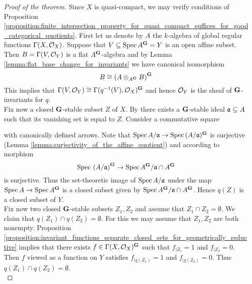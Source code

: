 \begin{proof}[Proof of the theorem]
Since $X$ is quasi-compact, we may verify conditions of Proposition \ref{proposition:finite_intersection_property_for_quasi_compact_suffices_for_good_categorical_quotients}. First let us denote by $A$ the $k$-algebra of global regular functions $\Gamma(X,{\mathcal O}_X)$. Suppose that $V \subseteq \mathrm{Spec}\, A^{\mathbf{G}} = Y$ is an open affine subset. Then $B = \Gamma(V,{\mathcal O}_Y)$ is a flat $A^{\mathbf{G}}$-algebra and by Lemma \ref{lemma:flat_base_change_for_invariants}  we have canonical isomorphism
$$B \cong \left(A\otimes_{A^{\mathbf{G}}}B\right)^{\mathbf{G}}$$
This implies that $\Gamma(V,{\mathcal O}_Y) \cong \Gamma(q^{-1}(V),{\mathcal O}_X)^{\mathbf{G}}$ and hence ${\mathcal O}_Y$ is the sheaf of $\mathbf{G}$-invariants for $q$.\\
Fix now a closed $\mathbf{G}$-stable subset $Z$ of $X$. By {\cite[Corollary 6.4]{Algebraic_groups}} there exists a $\mathbf{G}$-stable ideal $\mathfrak{a}\subseteq A$ such that its vanishing set is equal to $Z$. Consider a commutative square
\begin{center}
\end{center}
with canonically defined arrows. Note that $\mathrm{Spec}\, A/\mathfrak{a} \rightarrow \mathrm{Spec}\, (A/\mathfrak{a})^{\mathbf{G}}$ is surjective (Lemma \ref{lemma:surjectivity_of_the_affine_quotient}) and according to {\cite[Theorem 2.4]{Geometrically_reductive_and_Nagata}} morphism
$$\mathrm{Spec}\, \left(A/\mathfrak{a}\right)^{\mathbf{G}}\rightarrow \mathrm{Spec}\, A^{\mathbf{G}}/\mathfrak{a}\cap A^{\mathbf{G}}$$
is surjective. Thus the set-theoretic image of $\mathrm{Spec}\, A/\mathfrak{a}$ under the map $\mathrm{Spec}\, A\rightarrow \mathrm{Spec}\, A^{\mathbf{G}}$ is a closed subset given by $\mathrm{Spec}\, A^{\mathbf{G}}/\mathfrak{a}\cap A^{\mathbf{G}}$. Hence $q(Z)$ is a closed subset of $Y$.\\
Fix now two closed $\mathbf{G}$-stable subsets $Z_1,Z_2$ and assume that $Z_1\cap Z_2 = \emptyset$. We claim that $q(Z_1) \cap q(Z_2) = \emptyset$. For this we may assume that $Z_1,Z_2$ are both nonempty. Proposition \ref{proposition:invariant_functions_separate_closed_sets_for_geometrically_reductive} implies that there exists $f \in \Gamma(X,{\mathcal O}_X)^{\mathbf{G}}$ such that $f_{\mid Z_1} = 1$ and $f_{\mid Z_2} = 0$. Then $f$ viewed as a function on $Y$ satisfies $f_{\mid q(Z_1)} = 1$ and $f_{\mid q(Z_2)} = 0$. Thus $q(Z_1)\cap q(Z_2) = \emptyset$.\\

\end{proof}
